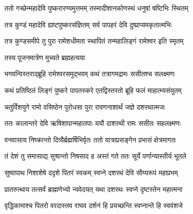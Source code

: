 
\vakta{}
\shrota{}
\tags{}
\notes{}

\storymeta





\twolineshloka
{ततो गच्छेन्महादेवि पुष्करारण्यमुत्तमम्}
{तस्मादीशानकोणस्थं धनुषां षष्टिभिः स्थितम्}%

\twolineshloka
{तत्र कुण्डं महादेवि ह्यष्टपुष्करसंज्ञितम्}
{सर्व पापहरं देवि दुष्प्राप्यमकृतात्मभिः}%

\twolineshloka
{तत्र कुण्डसमीपे तु पुरा रामेशधीमता}
{स्थापितं तन्महालिङ्गं रामेश्वर इति स्मृतम्}%

\onelineshloka
{तस्य पूजनमात्रेण मुच्यते ब्रह्महत्यया}%


\twolineshloka
{भगवन्विस्तराद्ब्रूहि रामेश्वरसमुद्भवम्}
{कथं तत्रागमद्रामः ससीतश्च सलक्ष्मणः}%

\twolineshloka
{कथं प्रतिष्ठितं लिङ्गं पुष्करे पापतस्करे}
{एतद्विस्तरतो ब्रूहि फलं माहात्म्यसंयुतम्}%


\twolineshloka
{चतुर्विंशयुगे रामो वसिष्ठेन पुरोधसा}
{पुरा रावणनाशार्थं जज्ञे दशरथात्मजः}%

\twolineshloka
{ततः कालान्तरे देवि ऋषिशापान्महातपाः}
{ययौ दाशरथी रामः ससीतः सहलक्ष्मणः}%

\twolineshloka
{वनवासाय निष्क्रान्तो दिव्यैर्ब्रह्मर्षिभिर्वृतः}
{ततो यात्राप्रसङ्गेन प्रभासं क्षेत्रमागतः}%

\twolineshloka
{तं देशं तु समासाद्य सुश्रान्तो निषसाद ह}
{अस्तं गते ततः सूर्ये पर्णान्यास्तीर्य भूतले}%

\twolineshloka
{सुष्वापाथ निशाशेषे ददृशे पितरं स्वकम्}
{स्वप्ने दशरथं देवि सौम्यरूपं महाप्रभम्}%

\twolineshloka
{प्रातरुत्थाय तत्सर्वं ब्राह्मणेभ्यो न्यवेदयत्}
{यथा दशरथः स्वप्ने दृष्टस्तेन महात्मना}%


\twolineshloka
{वृद्धिकामाश्च पितरो वरदास्तव राघव}
{दर्शनं हि प्रयच्छन्ति स्वप्नान्ते हि स्ववंशजे}%

